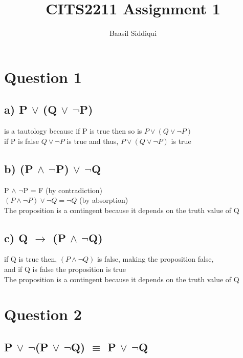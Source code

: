 \documentclass[11pt]{article}
\title{\textbf{CITS2211 Assignment 1}}
\author{Baasil Siddiqui}
\date{}
\begin{document}
\parskip 2mm
\maketitle
\thispagestyle{empty}

\section*{Question 1}

\subsection*{a) P $\lor$ (Q $\lor$ $\neg$P)}
is a tautology because if P is true then so is $P \lor (Q \lor \neg P)$ \\
if P is false $Q \lor \neg P$ is true and thus, $P \lor (Q \lor \neg P)$ is true

\subsection*{b) (P $\land$ $\neg$P) $\lor$ $\neg$Q}

P $\land$ $\neg$P = F (by contradiction) \\
$(P \land \neg P) \lor \neg Q = \neg Q$ (by absorption) \\
\newline
The proposition is a contingent because it depends on the truth value of Q


\subsection*{c) Q $\rightarrow$ (P $\land$ $\neg$Q)}
if Q is true then, $(P \land \neg Q)$ is false, making the proposition false, \\
and if Q is false the proposition is true \\
The proposition is a contingent because it depends on the truth value of Q

\section*{Question 2}
\subsection*{P $\lor$ $\neg$(P $\lor$ $\neg$Q) $\equiv$ P $\lor$ $\neg$Q}
\end{document}
